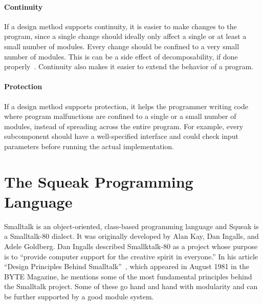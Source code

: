 \paragraph{Continuity}
If a design method supports continuity, it is easier to make changes to the program, since a single change should ideally only affect a single or at least a small number of modules. Every change should be confined to a very small number of modules. This is can be a side effect of decomposability, if done properly~\cite{Parnas:1972:CUD:361598.361623}. Continuity also makes it easier to extend the behavior of a program.

\paragraph{Protection}
If a design method supports protection, it helps the programmer writing code where program malfunctions are confined to a single or a small number of modules, instead of spreading across the entire program. For example, every subcomponent should have a well-specified interface and could check input parameters before running the actual implementation.

\section{The Squeak Programming Language}
Smalltalk is an object-oriented, class-based programming language and Squeak is a Smalltalk-80 dialect. It was originally developed by Alan Kay, Dan Ingalls, and Adele Goldberg. Dan Ingalls described Smallktalk-80 as a project whose purpose is to ``provide computer support for the creative spirit in everyone.'' In his article ``Design Principles Behind Smalltalk''~\cite{Inga81a}, which appeared in August 1981 in the BYTE Magazine, he mentions some of the most fundamental principles behind the Smalltalk project. Some of these go hand and hand with modularity and can be further supported by a good module system.

